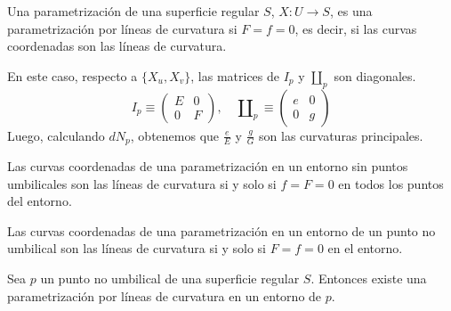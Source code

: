 \begin{definition}
    Una parametrización de una superficie regular $S$, $X: U \to S$, es una parametrización por líneas de curvatura si $F = f = 0$, es decir, si las curvas coordenadas son las líneas de curvatura.
\end{definition}

\begin{remark}
    En este caso, respecto a $\{X_u, X_v\}$, las matrices de $I_p$ y $\amalg_p$ son diagonales.
    $$I_p \equiv
        \begin{pmatrix}
            E & 0 \\
            0 & F
        \end{pmatrix}, \quad
        \amalg_p \equiv
        \begin{pmatrix}
            e & 0 \\
            0 & g
        \end{pmatrix}$$
    Luego, calculando $dN_p$, obtenemos que $\frac{e}{E}$ y $\frac{g}{G}$ son las curvaturas principales.
\end{remark}

\begin{proposition}
    Las curvas coordenadas de una parametrización en un entorno sin puntos umbilicales son las líneas de curvatura si y solo si $f = F = 0$ en todos los puntos del entorno.
\end{proposition}

\begin{corollary}
    Las curvas coordenadas de una parametrización en un entorno de un punto no umbilical son las líneas de curvatura si y solo si $F = f = 0$ en el entorno.
\end{corollary}

\begin{theorem}
    Sea $p$ un punto no umbilical de una superficie regular $S$.
    Entonces existe una parametrización por líneas de curvatura en un entorno de $p$.
\end{theorem}